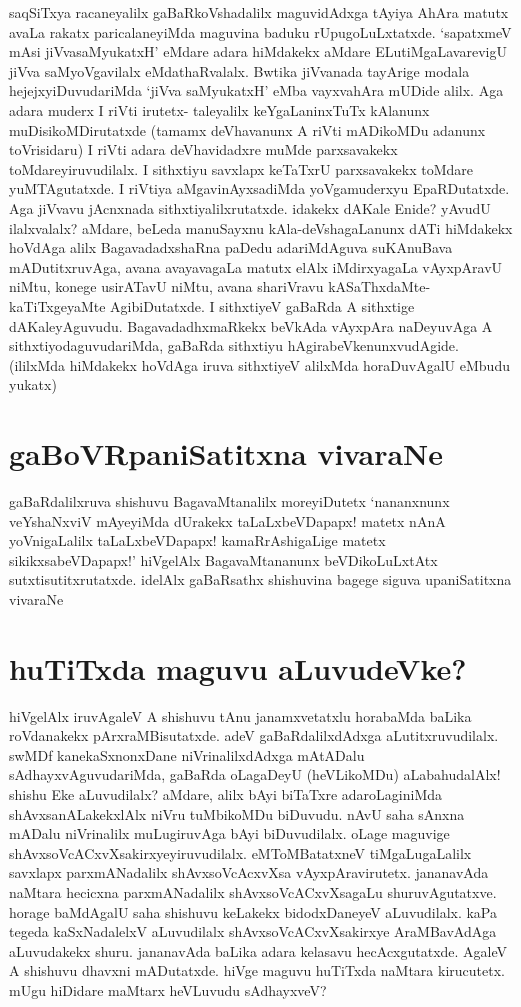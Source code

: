 saqSiTxya racaneyalilx gaBaRkoVshadalilx maguvidAdxga tAyiya AhAra matutx avaLa rakatx paricalaneyiMda maguvina baduku rUpugoLuLxtatxde. `sapatxmeV mAsi jiVvasaMyukatxH' eMdare adara hiMdakekx aMdare ELutiMgaLavarevigU jiVva saMyoVgavilalx eMdathaRvalalx. Bwtika jiVvanada tayArige modala hejejxyiDuvudariMda `jiVva saMyukatxH' eMba vayxvahAra mUDide alilx. Aga adara muderx I riVti irutetx- taleyalilx keYgaLaninxTuTx kAlanunx muDisikoMDirutatxde (tamamx deVhavanunx A riVti mADikoMDu adanunx toVrisidaru) I riVti adara deVhavidadxre muMde parxsavakekx toMdareyiruvudilalx. I sithxtiyu savxlapx keTaTxrU parxsavakekx toMdare yuMTAgutatxde. I riVtiya aMgavinAyxsadiMda yoVgamuderxyu EpaRDutatxde. Aga jiVvavu jAcnxnada sithxtiyalilxrutatxde. idakekx dAKale Enide? yAvudU ilalxvalalx? aMdare, beLeda manuSayxnu kAla-deVshagaLanunx dATi hiMdakekx hoVdAga alilx BagavadadxshaRna paDedu adariMdAguva suKAnuBava mADutitxruvAga, avana avayavagaLa matutx elAlx iMdirxyagaLa vAyxpAravU niMtu, konege usirATavU niMtu, avana shariVravu kASaThxdaMte-kaTiTxgeyaMte AgibiDutatxde. I sithxtiyeV gaBaRda A sithxtige dAKaleyAguvudu. BagavadadhxmaRkekx beVkAda vAyxpAra naDeyuvAga A sithxtiyodaguvudariMda, gaBaRda sithxtiyu hAgirabeVkenunxvudAgide. (ililxMda hiMdakekx hoVdAga iruva sithxtiyeV alilxMda horaDuvAgalU eMbudu yukatx)

\section*{gaBoVRpaniSatitxna vivaraNe}

gaBaRdalilxruva shishuvu BagavaMtanalilx moreyiDutetx `nananxnunx veYshaNxviV mAyeyiMda dUrakekx taLaLxbeVDapapx! matetx nAnA yoVnigaLalilx taLaLxbeVDapapx! kamaRrAshigaLige matetx sikikxsabeVDapapx!' hiVgelAlx BagavaMtananunx beVDikoLuLxtAtx sutxtisutitxrutatxde. idelAlx gaBaRsathx shishuvina bagege siguva upaniSatitxna vivaraNe

\section*{huTiTxda maguvu aLuvudeVke?}

hiVgelAlx iruvAgaleV A shishuvu tAnu janamxvetatxlu horabaMda baLika roVdanakekx pArxraMBisutatxde. adeV gaBaRdalilxdAdxga aLutitxruvudilalx. swMDf kanekaSxnonxDane niVrinalilxdAdxga mAtADalu sAdhayxvAguvudariMda, gaBaRda oLagaDeyU (heVLikoMDu) aLabahudalAlx! shishu Eke aLuvudilalx? aMdare, alilx bAyi biTaTxre adaroLaginiMda shAvxsanALakekxlAlx niVru tuMbikoMDu biDuvudu. nAvU saha sAnxna mADalu niVrinalilx muLugiruvAga bAyi biDuvudilalx. oLage maguvige shAvxsoVcACxvXsakirxyeyiruvudilalx. eMToMBatatxneV tiMgaLugaLalilx savxlapx parxmANadalilx shAvxsoVcAcxvXsa vAyxpAravirutetx. jananavAda naMtara hecicxna parxmANadalilx shAvxsoVcACxvXsagaLu shuruvAgutatxve. horage baMdAgalU saha shishuvu keLakekx bidodxDaneyeV aLuvudilalx. kaPa tegeda kaSxNadalelxV aLuvudilalx shAvxsoVcACxvXsakirxye AraMBavAdAga aLuvudakekx shuru. jananavAda baLika adara kelasavu hecAcxgutatxde. AgaleV A shishuvu dhavxni mADutatxde. hiVge maguvu huTiTxda naMtara kirucutetx. mUgu hiDidare maMtarx heVLuvudu sAdhayxveV?

